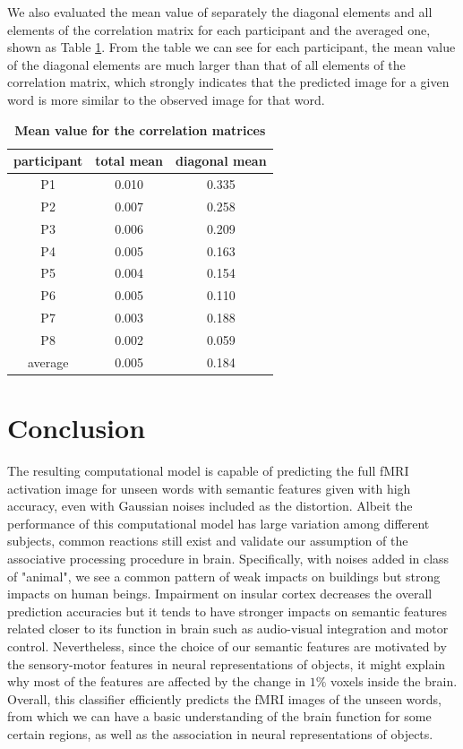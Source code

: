 \documentclass{article}
\begin{document}
We also evaluated the mean value of separately the diagonal elements and all elements of the correlation matrix for each participant and the averaged one, shown as Table \ref{table1}. From the table we can see for each participant, the mean value of the diagonal elements are much larger than that of all elements of the correlation matrix, which strongly indicates that the predicted image for a given word is more similar to the observed image for that word. 

\begin{table} 
    \centering
    \caption{{\bf Mean value for the correlation matrices}}\label{table1}
    \begin{tabular}{ccc}
    \hline
    participant & total mean & diagonal mean\\
    \hline
    P1 & 0.010 & 0.335   \\
    P2 & 0.007 & 0.258   \\
    P3 & 0.006 & 0.209   \\
    P4 & 0.005 & 0.163   \\
    P5 & 0.004 & 0.154   \\
    P6 & 0.005 & 0.110   \\
    P7 & 0.003 & 0.188   \\
    P8 & 0.002 & 0.059   \\
    average & 0.005 & 0.184   \\
    \hline
    \end{tabular}
\end{table}

\section{Conclusion}
The resulting computational model is capable of predicting the full fMRI activation image for unseen words with semantic features given with high accuracy, even with Gaussian noises included as the distortion. Albeit the performance of this computational model has large variation among different subjects, common reactions still exist and validate our assumption of the associative processing procedure in brain. Specifically, with noises added in class of "animal", we see a common pattern of weak impacts on buildings but strong impacts on human beings. Impairment on insular cortex decreases the overall prediction accuracies but it tends to have stronger impacts on semantic features related closer to its function in brain such as audio-visual integration and motor control. Nevertheless, since the choice of our semantic features are motivated by the sensory-motor features in neural representations of objects, it might explain why most of the features are affected by the change in $1\%$ voxels inside the brain. Overall, this classifier efficiently predicts the fMRI images of the unseen words, from which we can have a basic understanding of the brain function for some certain regions, as well as the association in neural representations of objects.
\end{document}

